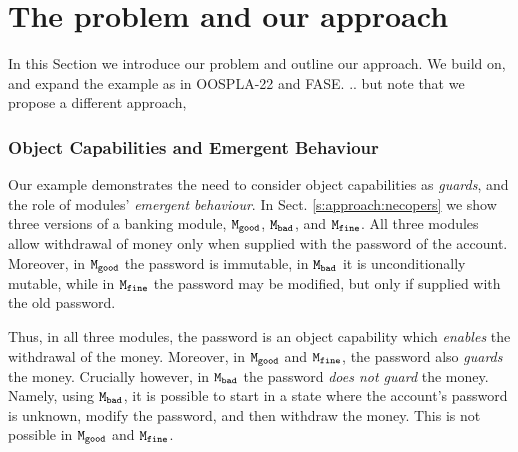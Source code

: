 

\section{The problem and our approach}
\label{s:outline}
 
In this Section we introduce our problem and outline our approach. 
 We build on, and expand the  example as in OOSPLA-22 and FASE. .. but note that we propose a different approach, %
 
  \subsubsection{Object Capabilities and Emergent Behaviour} %
\label{s:bank}
Our example  demonstrates the need to consider object capabilities as \emph{guards}, and the role
of {modules'} \emph{emergent behaviour}. 
%
In Sect.  \ref{s:approach:necopers} we show three versions of a banking module, ${\texttt{M}}_{{\texttt{good}}}$, ${\texttt{M}}_{{\texttt{bad}}}$, and ${\texttt{M}}_{{\texttt{fine}}}$. 
All three modules allow withdrawal of  money only when supplied with the password of the account.
Moreover, in ${\texttt{M}}_{{\texttt{good}}}$ the password is immutable, in ${\texttt{M}}_{{\texttt{bad}}}$ it is unconditionally mutable, while in ${\texttt{M}}_{{\texttt{fine}}}$ the password may be modified, but only if supplied with the old password. 


{Thus, in all three modules, the password is an object capability which \emph{enables} the withdrawal of the money. 
Moreover, in ${\texttt{M}}_{{\texttt{good}}}$ and ${\texttt{M}}_{{\texttt{fine}}}$, the password also \emph{guards} the money.
Crucially however,  in ${\texttt{M}}_{{\texttt{bad}}}$ the password \emph{does not guard} the money. 
 Namely, using ${\texttt{M}}_{{\texttt{bad}}}$, it is possible to start in a state where the account's password is unknown, modify the password, and then withdraw the money. 
 This is not possible  in ${\texttt{M}}_{{\texttt{good}}}$ and ${\texttt{M}}_{{\texttt{fine}}}$.
}

